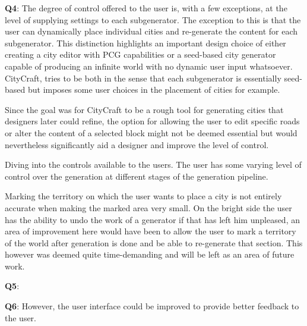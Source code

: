 \textbf{Q4}: \newline
The degree of control offered to the user is, with a few exceptions, at the level of supplying settings to each subgenerator.
The exception to this is that the user can dynamically place individual cities and re-generate the content for each subgenerator.
This distinction highlights an important design choice of either creating a city editor with PCG capabilities or a seed-based city generator capable of producing an infinite world with no dynamic user input whatsoever.
CityCraft, tries to be both in the sense that each subgenerator is essentially seed-based but imposes some user choices in the placement of cities for example.

Since the goal was for CityCraft to be a rough tool for generating cities that designers later could refine, the option for allowing the user to edit specific roads or alter the content of a selected block might not be deemed essential but would nevertheless significantly aid a designer and improve the level of control.

Diving into the controls available to the users.
The user has some varying level of control over the generation at different stages of the generation pipeline.

Marking the territory on which the user wants to place a city is not entirely accurate when making the marked area very small. 
On the bright side the user has the ability to undo the work of a generator if that has left him unpleased, an area of improvement here would have been to allow the user to mark a territory of the world after generation is done and be able to re-generate that section.
This however was deemed quite time-demanding and will be left as an area of future work. 

\textbf{Q5}: \newline


\textbf{Q6}: \newline
However, the user interface could be improved to provide better feedback to the user.

